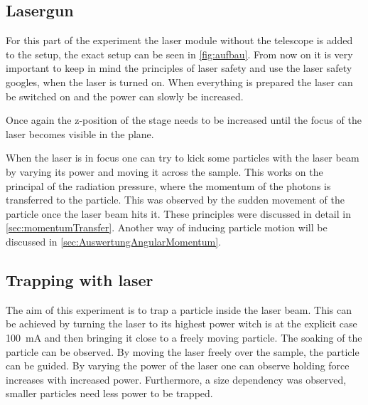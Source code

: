 \documentclass[12pt,english]{scrartcl}
\begin{document}
\subsection{Lasergun}

For this part of the experiment the laser module without the telescope is added
to the setup, the exact setup can be seen in \autoref{fig:aufbau}. From now on
it is very important to keep in mind the principles of laser safety and use the
laser safety googles, when the laser is turned on. When everything is prepared
the laser can be switched on and the power can slowly be increased.

Once again the z-position of the stage needs to be increased until the focus of
the laser becomes visible in the plane.

When the laser is in focus one can try to kick some particles with the laser
beam by varying its power and moving it across the sample. This works on the
principal of the radiation pressure, where the momentum of the photons is
transferred to the particle. This was observed by the sudden movement of the
particle once the laser beam hits it. These principles were discussed in detail
in \autoref{sec:momentumTransfer}. Another way of inducing particle motion will
be discussed in \autoref{sec:AuswertungAngularMomentum}.

\subsection{Trapping with laser}

The aim of this experiment is to trap a particle inside the laser beam. This
can be achieved by turning the laser to its highest power witch is at the
explicit case \SI{100}{\milli\ampere} and then bringing it close to a freely
moving particle. The soaking of the particle can be observed. By moving the
laser freely over the sample, the particle can be guided. By varying the power
of the laser one can observe holding force increases with increased power.
Furthermore, a size dependency was observed, smaller particles need less power
to be trapped.
\end{document}
